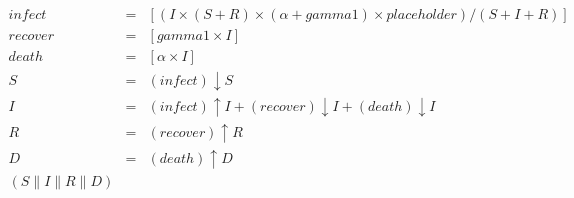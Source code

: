 \begin{eqnarray*}
\mathit{infect} & = & [(I\times (S+R)\times (\alpha+\mathit{gamma1})\times \mathit{placeholder})/(S+I+R)]\\%
\mathit{recover} & = & [\mathit{gamma1}\times I]\\%
\mathit{death} & = & [\alpha\times I]\\%
%
S & = & (\mathit{infect}){\downarrow}S\\%
I & = & (\mathit{infect}){\uparrow}I + (\mathit{recover}){\downarrow}I + (\mathit{death}){\downarrow}I\\%
R & = & (\mathit{recover}){\uparrow}R\\%
D & = & (\mathit{death}){\uparrow}D\\%
%
(S {\parallel} I {\parallel} R {\parallel} D)\end{eqnarray*}
